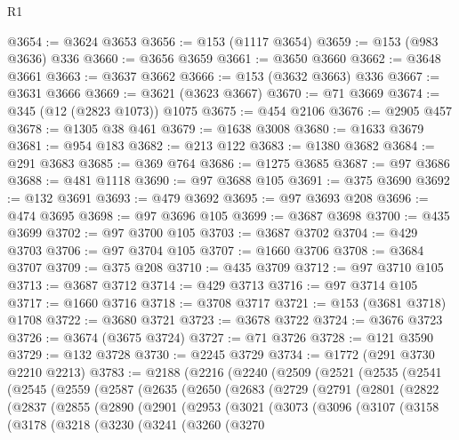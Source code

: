 \begin{lexlean}{R1}
\begin{coremodule}
{{{{{{{{{{{{{{{{{{{{{{{{{{{{{{{{{{{{{{{{{{{{{{{{{{{{{{{{{{{{{{{{{{{{{{{{{{{{{{{{{{{{{{{{{{{{{{{{{{{{{{{{{{{{{{{{{{{{{{{{{{{{{{{{{{{{{{{{{{{{{{{{{{{{{{{{{{{{{{{{{{{{{{{{{{{{{{{{{{{{{{{{{{@3654 := @3624 @3653
@3656 := @153 (@1117 @3654)
@3659 := @153 (@983 @3636) @336
@3660 := @3656 @3659
@3661 := @3650 @3660
@3662 := @3648 @3661
@3663 := @3637 @3662
@3666 := @153 (@3632 @3663) @336
@3667 := @3631 @3666
@3669 := @3621 (@3623 @3667)
@3670 := @71 @3669
@3674 := @345 (@12 (@2823 @1073)) @1075
@3675 := @454 @2106
@3676 := @2905 @457
@3678 := @1305 @38 @461
@3679 := @1638 @3008
@3680 := @1633 @3679
@3681 := @954 @183
@3682 := @213 @122
@3683 := @1380 @3682
@3684 := @291 @3683
@3685 := @369 @764
@3686 := @1275 @3685
@3687 := @97 @3686
@3688 := @481 @1118
@3690 := @97 @3688 @105
@3691 := @375 @3690
@3692 := @132 @3691
@3693 := @479 @3692
@3695 := @97 @3693 @208
@3696 := @474 @3695
@3698 := @97 @3696 @105
@3699 := @3687 @3698
@3700 := @435 @3699
@3702 := @97 @3700 @105
@3703 := @3687 @3702
@3704 := @429 @3703
@3706 := @97 @3704 @105
@3707 := @1660 @3706
@3708 := @3684 @3707
@3709 := @375 @208
@3710 := @435 @3709
@3712 := @97 @3710 @105
@3713 := @3687 @3712
@3714 := @429 @3713
@3716 := @97 @3714 @105
@3717 := @1660 @3716
@3718 := @3708 @3717
@3721 := @153 (@3681 @3718) @1708
@3722 := @3680 @3721
@3723 := @3678 @3722
@3724 := @3676 @3723
@3726 := @3674 (@3675 @3724)
@3727 := @71 @3726
@3728 := @121 @3590
@3729 := @132 @3728
@3730 := @2245 @3729
@3734 := @1772 (@291 @3730 @2210 @2213)
@3783 := @2188
    (@2216
      (@2240
        (@2509
          (@2521
            (@2535
              (@2541
                (@2545
                  (@2559
                    (@2587
                      (@2635
                        (@2650
                          (@2683
                            (@2729
                              (@2791
                                (@2801
                                  (@2822
                                    (@2837
                                      (@2855
                                        (@2890
                                          (@2901
                                            (@2953
                                              (@3021
                                                (@3073
                                                  (@3096
                                                    (@3107
                                                      (@3158
                                                        (@3178
                                                          (@3218
                                                            (@3230
                                                              (@3241
                                                                (@3260
                                                                  (@3270
}}}}}}}}}}}}}}}}}}}}}}}}}}}}}}}}}}}}}}}}}}}}}}}}}}}}}}}}}}}}}}}}}}}}}}}}}}}}}}}}}}}}}}}}}}}}}}}}}}}}}}}}}}}}}}}}}}}}}}}}}}}}}}}}}}}}}}}}}}}}}}}}}}}}}}}}}}}}}}}}}}}}}}}}}}}}}}}}}}}}}}}}}}
\end{coremodule}
\end{lexlean}

